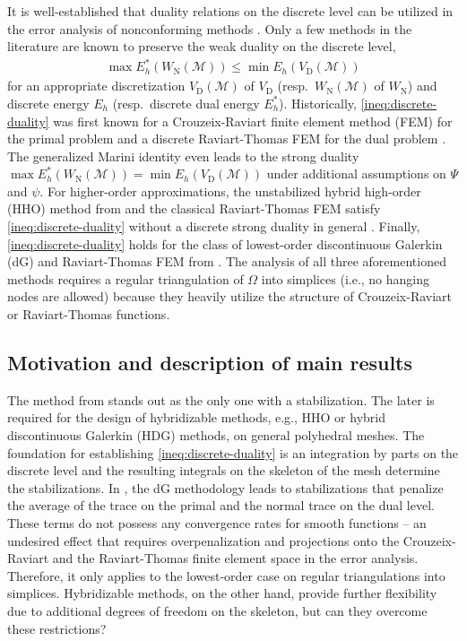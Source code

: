 \documentclass[a4paper]{amsart}
\numberwithin{equation}{section}
\newcommand{\Mcal}{\mathcal{M}}
\theoremstyle{remark}
\begin{document}
It is well-established that duality relations on the discrete level can be utilized in the error analysis of nonconforming methods \cite{CarstensenLiu2015,Bartels2021,Bartels2021b,CarstensenTran2021}.
Only a few methods in the literature are known to preserve the weak duality on the discrete level,
\begin{align}\label{ineq:discrete-duality}
	\max E_h^*(W_\mathrm{N}(\Mcal)) \leq \min E_h(V_\mathrm{D}(\Mcal))
\end{align}
for an appropriate discretization $V_\mathrm{D}(\Mcal)$ of $V_\mathrm{D}$ (resp.~$W_\mathrm{N}(\Mcal)$ of $W_\mathrm{N}$) and discrete energy $E_h$ (resp.~discrete dual energy $E_h^*$).
Historically, \eqref{ineq:discrete-duality} was first known for a Crouzeix-Raviart finite element method (FEM) for the primal problem and a discrete Raviart-Thomas FEM for the dual problem \cite{Marini1985,CarstensenLiu2015,Bartels2021b}.
The generalized Marini identity even leads to the strong duality $\max E_h^*(W_\mathrm{N}(\Mcal)) = \min E_h(V_\mathrm{D}(\Mcal))$ under additional assumptions on $\Psi$ and $\psi$.
For higher-order approximations, the unstabilized hybrid high-order (HHO) method from \cite{AbbasErnPignet2018} and the classical Raviart-Thomas FEM satisfy \eqref{ineq:discrete-duality} without a discrete strong duality in general \cite{CarstensenTran2021}.
Finally, \eqref{ineq:discrete-duality} holds for
the class of lowest-order discontinuous Galerkin (dG) and Raviart-Thomas FEM from \cite{Bartels2021}.
The analysis of all three aforementioned methods requires a regular triangulation of $\Omega$ into simplices (i.e., no hanging nodes are allowed) because they heavily utilize the structure of Crouzeix-Raviart or Raviart-Thomas functions.

\subsection{Motivation and description of main results}
The method from \cite{Bartels2021} stands out as the only one with a stabilization.
The later is required for the design of hybridizable methods, e.g., HHO or hybrid discontinuous Galerkin (HDG) methods, on general polyhedral meshes.
The foundation for establishing \eqref{ineq:discrete-duality} is an integration by parts on the discrete level and the resulting integrals on the skeleton of the mesh determine the stabilizations. In \cite{Bartels2021}, the dG methodology leads to stabilizations that penalize the average of the trace on the primal and the normal trace on the dual level.
These terms do not possess any convergence rates for smooth functions -- an undesired effect that requires overpenalization and projections onto the Crouzeix-Raviart and the Raviart-Thomas finite element space in the error analysis.
Therefore, it only applies to the lowest-order case on regular triangulations into simplices.
Hybridizable methods, on the other hand, provide further flexibility due to additional degrees of freedom on the skeleton, but can they overcome these restrictions?
\end{document}
